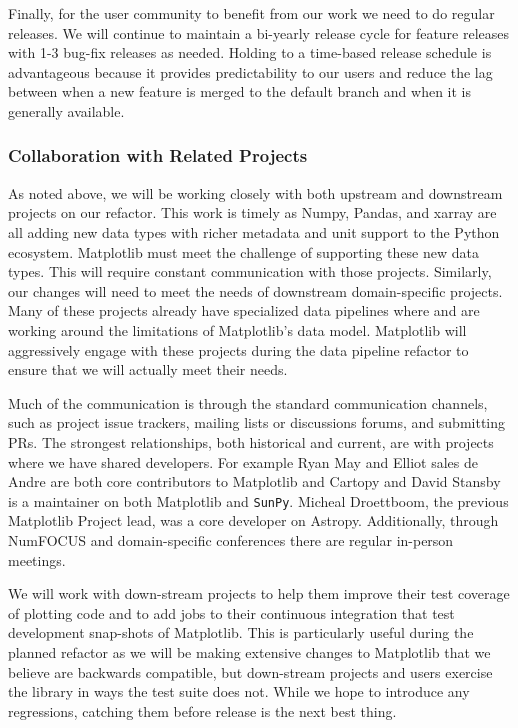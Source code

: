 \documentclass[12pt]{article}
\numberwithin{page}{section}
\begin{document}
Finally, for the user community to benefit from our work we need to do
regular releases.  We will continue to maintain a bi-yearly release
cycle for feature releases with 1-3 bug-fix releases as needed.
Holding to a time-based release schedule is advantageous because it
provides predictability to our users and reduce the lag between when a
new feature is merged to the default branch and when it is generally
available.


\subsubsection{Collaboration with Related Projects}

As noted above, we will be working closely with both upstream and
downstream projects on our refactor.  This work is timely as Numpy,
Pandas, and xarray are all adding new data types with richer metadata
and unit support to the Python ecosystem.  Matplotlib must meet the
challenge of supporting these new data types.  This will require
constant communication with those projects.  Similarly, our changes
will need to meet the needs of downstream domain-specific projects.
Many of these projects already have specialized data pipelines where
and are working around the limitations of Matplotlib's data model.
Matplotlib will aggressively engage with these projects during the
data pipeline refactor to ensure that we will actually meet their
needs.

Much of the communication is through the standard communication
channels, such as project issue trackers, mailing lists or discussions
forums, and submitting PRs.  The strongest relationships, both
historical and current, are with projects where we have shared
developers.  For example Ryan May and Elliot sales de Andre are both
core contributors to Matplotlib and Cartopy and David Stansby is a
maintainer on both Matplotlib and \texttt{SunPy}.  Micheal Droettboom,
the previous Matplotlib Project lead, was a core developer on Astropy.
Additionally, through NumFOCUS and domain-specific conferences there
are regular in-person meetings.

We will work with down-stream projects to help them improve their test
coverage of plotting code and to add jobs to their continuous
integration that test development snap-shots of Matplotlib.  This is
particularly useful during the planned refactor as we will be making
extensive changes to Matplotlib that we believe are backwards
compatible, but down-stream projects and users exercise the library in
ways the test suite does not.  While we hope to introduce any
regressions, catching them before release is the next best thing.
\end{document}
